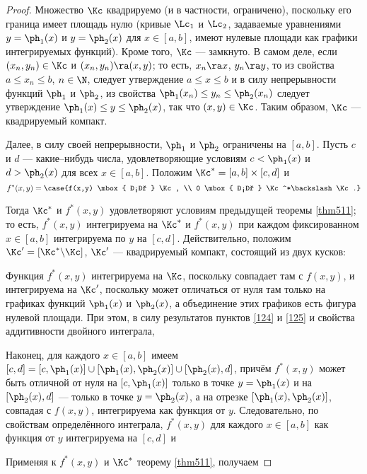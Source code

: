 \documentclass[a4paper]{article}
\begin{document}
\begin{proof}
Множество $\Kc$ квадрируемо (и в частности, ограничено), поскольку
его граница имеет площадь нулю (кривые $\Lc_1$ и $\Lc_2$, задаваемые
уравнениями $y=\ph_1(x)$ и $y=\ph_2(x)$ для $x\in[a,b]$, имеют
нулевые площади как графики интегрируемых функций). Кроме того,
$\Kc$ --- замкнуто. В самом деле, если $(x_n,y_n)\in\Kc$ и
$(x_n,y_n)\ra(x,y)$; то есть, $x_n\ra x$, $y_n\ra y$, то из свойства
$a\le x_n\le b$, $n\in\N$, следует утверждение $a\le x\le b$ и в
силу непрерывности функций $\ph_1$ и $\ph_2$, из свойства
$\ph_1(x_n)\le y_n \le \ph_2(x_n)$ следует утверждение $\ph_1(x)\le
y\le\ph_2(x)$, так что $(x,y)\in\Kc$. Таким образом, $\Kc$ ---
квадрируемый компакт.

Далее, в силу своей непрерывности, $\ph_1$ и $\ph_2$ ограничены на
$[a,b]$. Пусть $c$ и $d$ --- какие--нибудь числа, удовлетворяющие
условиям $c<\ph_1(x)$ и $d>\ph_2(x)$ для всех $x\in[a,b]$. Положим
$\Kc^*=[a,b]\times[c,d]$ и $$f^*(x,y)=\case{f(x,y) \mbox{ на } \Kc,
\\ 0 \mbox{ на } \Kc^*\backslash\Kc.}$$

Тогда $\Kc^*$ и $f^*(x,y)$ удовлетворяют условиям предыдущей теоремы
\ref{thm511}; то есть, $f^*(x,y)$ интегрируема на $\Kc^*$ и
$f^*(x,y)$ при каждом фиксированном $x\in[a,b]$ интегрируема по $y$
на $[c,d]$. Действительно, положим $\Kc'=[\Kc^*\backslash \Kc]$,
$\Kc'$ --- квадрируемый компакт, состоящий из двух кусков:

Функция $f^*(x,y)$ интегрируема на $\Kc$, поскольку совпадает там с
$f(x,y)$, и интегрируема на $\Kc'$, поскольку может отличаться от
нуля там только на графиках функций $\ph_1(x)$ и $\ph_2(x)$, а
объединение этих графиков есть фигура нулевой площади. При этом, в
силу результатов пунктов \ref{124} и \ref{125} и свойства
аддитивности двойного интеграла, 

Наконец, для каждого $x\in[a,b]$ имеем
$[c,d]=[c,\ph_1(x)]\cup[\ph_1(x),\ph_2(x)]\cup[\ph_2(x),d]$, причём
$f^*(x,y)$ может быть отличной от нуля на $[c,\ph_1(x)]$ только в
точке $y=\ph_1(x)$ и на $[\ph_2(x),d]$ --- только в точке
$y=\ph_2(x)$, а на отрезке $[\ph_1(x),\ph_2(x)]$, совпадая с
$f(x,y)$, интегрируема как функция от $y$. Следовательно, по
свойствам определённого интеграла, $f^*(x,y)$ для каждого
$x\in[a,b]$ как функция от $y$ интегрируема на $[c,d]$ и

Применяя к $f^*(x,y)$ и $\Kc^*$ теорему \ref{thm511}, получаем
\end{proof}
\end{document}
